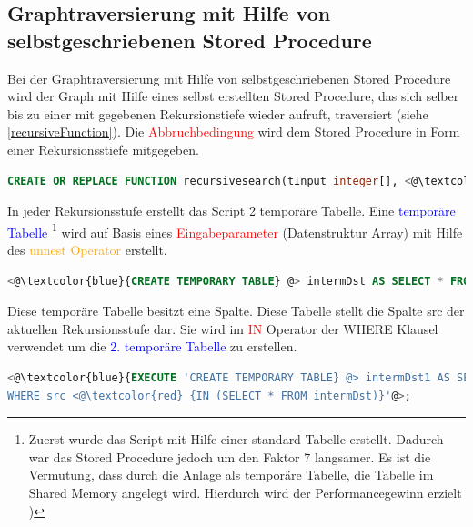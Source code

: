 \subsection{Graphtraversierung mit Hilfe von selbstgeschriebenen Stored Procedure}
\label{postgresRecursiveFunction}
Bei der Graphtraversierung mit Hilfe von selbstgeschriebenen Stored Procedure wird der Graph mit Hilfe eines selbst erstellten Stored Procedure, das sich selber bis
zu einer mit gegebenen Rekursionstiefe wieder aufruft, traversiert (siehe \ref{recursiveFunction}). Die \textcolor{red}{Abbruchbedingung} wird dem Stored Procedure in Form einer
Rekursionsstiefe mitgegeben.
\begin{lstlisting}[language=SQL,caption = Abbruchbedingung recursiveSearch,frame=single, label={AbbruchbedingungRecursiveSearch} ]
    CREATE OR REPLACE FUNCTION recursivesearch(tInput integer[], <@\textcolor{red}{iRecursionDepth integer} @>, sTable text) RETURNS SETOF integer AS
\end{lstlisting}
In jeder Rekursionsstufe erstellt das Script 2 temporäre Tabelle. Eine \textcolor{blue}{temporäre Tabelle} \footnote{Zuerst wurde das Script mit Hilfe einer standard Tabelle
erstellt. Dadurch war das Stored Procedure jedoch um den Faktor 7 langsamer. Es ist die Vermutung, dass durch die Anlage als temporäre Tabelle, die Tabelle im Shared Memory angelegt wird.
Hierdurch wird der Performancegewinn erzielt  \cite[S.26]{froehlich01})}
wird auf Basis eines \textcolor{red}{Eingabeparameter} (Datenstruktur Array) mit Hilfe des \textcolor{orange}{unnest Operator} erstellt.
\begin{lstlisting}[language=SQL,caption = Signatur recursiveSearch,frame=single, label={AbbruchbedingungRecursiveSearch} ]
    <@\textcolor{blue}{CREATE TEMPORARY TABLE} @> intermDst AS SELECT * FROM <@\textcolor{orange} {unnest} @> <@\textcolor{red}{(tInput)}@>;
\end{lstlisting}
Diese temporäre Tabelle besitzt eine Spalte. Diese Tabelle stellt die Spalte src der aktuellen Rekursionsstufe dar. Sie wird im \textcolor{red}{IN} Operator der WHERE Klausel verwendet
um die \textcolor{blue}{2. temporäre Tabelle} zu erstellen.
\begin{lstlisting}[language=SQL,caption = Erstellen 2. temporäre Tabelle,frame=single, label={AbbruchbedingungRecursiveSearch} ]
<@\textcolor{blue}{EXECUTE 'CREATE TEMPORARY TABLE} @> intermDst1 AS SELECT DISTINCT(dst) FROM ' || sTable || '
WHERE src <@\textcolor{red} {IN (SELECT * FROM intermDst)}'@>;
\end{lstlisting}
